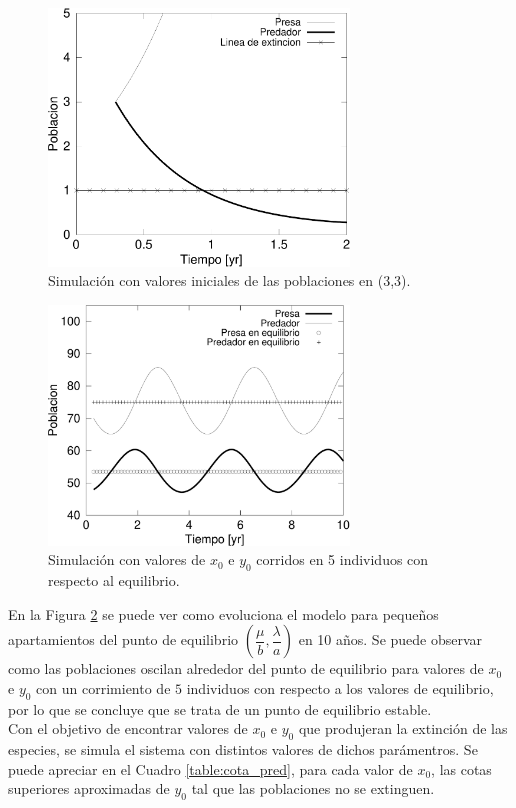 \documentclass{article}
\numberwithin{equation}{section}
\begin{document}
\begin{multicols}{2}
\begin{figure}[H]
\centering
\includegraphics[width=8cm]{images/b1}
\caption{Simulación con valores iniciales de las poblaciones en (3,3).}
\label{equilibrio_00}
\end{figure}

\begin{figure}[H]
\centering
\includegraphics[width=8cm]{images/b2}
\caption{Simulación con valores de $x_0$ e $y_0$ corridos en 5 individuos con respecto al equilibrio.}
\label{equilibrio_55}
\end{figure}


En la Figura \ref{equilibrio_55} se puede ver como evoluciona el modelo para pequeños apartamientos del punto de equilibrio $(\dfrac{\mu}{b},\dfrac{\lambda}{a})$ en 10 años. Se puede observar como las poblaciones oscilan alrededor del punto de equilibrio para valores de $x_0$ e $y_0$ con un corrimiento de $5$ individuos con respecto a los valores de equilibrio, por lo que se concluye que se trata de un punto de equilibrio estable. \\


Con el objetivo de encontrar valores de $x_0$ e $y_0$ que produjeran la extinción de las especies, se simula el sistema con distintos valores de dichos parámentros. Se puede apreciar en el Cuadro \ref{table:cota_pred}, para cada valor de $x_0$, las cotas superiores aproximadas de $y_0$ tal que las poblaciones no se extinguen.



\end{multicols}
\end{document}
